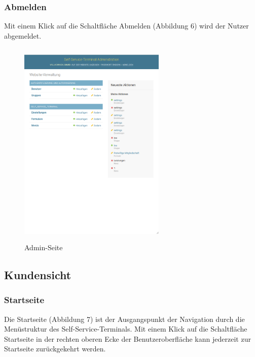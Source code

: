 \subsubsection{Abmelden} Mit einem Klick auf die Schaltfläche \glqq Abmelden\grqq{} (Abbildung 6) wird der Nutzer abgemeldet.

\begin{figure}[htp]
    \centering
    \includegraphics[width=7cm , height=10cm]{Bilder/AdminSeite.png}
    \caption[Startseite des Self-Service-Terminals]{Admin-Seite}
    \label{fig:SSTAdminSeite}
\end{figure}

\newpage

\subsection{Kundensicht}


\subsubsection{Startseite} Die Startseite (Abbildung 7) ist der Ausgangspunkt der Navigation durch die Menüstruktur des Self-Service-Terminals. Mit einem Klick auf die Schaltfläche \glqq Startseite\grqq{} in der rechten oberen Ecke der Benutzeroberfläche kann jederzeit zur Startseite zurückgekehrt werden.

